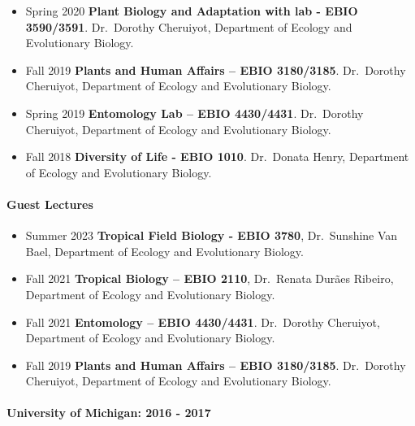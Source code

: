 \documentclass[11pt,a4paper,]{awesome-cv}
\begin{document}
\begin{itemize}
\item
  Spring 2020 \textbar{} \textbf{Plant Biology and Adaptation with lab -
  EBIO 3590/3591}. Dr.~Dorothy Cheruiyot, Department of Ecology and
  Evolutionary Biology.\\
\item
  Fall 2019 \textbar{} \textbf{Plants and Human Affairs -- EBIO
  3180/3185}. Dr.~Dorothy Cheruiyot, Department of Ecology and
  Evolutionary Biology.\\
\item
  Spring 2019 \textbar{} \textbf{Entomology Lab -- EBIO 4430/4431}.
  Dr.~Dorothy Cheruiyot, Department of Ecology and Evolutionary
  Biology.\\
\item
  Fall 2018 \textbar{} \textbf{Diversity of Life - EBIO 1010}.
  Dr.~Donata Henry, Department of Ecology and Evolutionary Biology.\\
\end{itemize}

\hypertarget{guest-lectures}{%
\paragraph{Guest Lectures}\label{guest-lectures}}

\begin{itemize}
\item
  Summer 2023 \textbar{} \textbf{Tropical Field Biology - EBIO 3780},
  Dr.~Sunshine Van Bael, Department of Ecology and Evolutionary Biology.
\item
  Fall 2021 \textbar{} \textbf{Tropical Biology -- EBIO 2110},
  Dr.~Renata Durães Ribeiro, Department of Ecology and Evolutionary
  Biology.\\
\item
  Fall 2021 \textbar{} \textbf{Entomology -- EBIO 4430/4431}.
  Dr.~Dorothy Cheruiyot, Department of Ecology and Evolutionary
  Biology.\\
\item
  Fall 2019 \textbar{} \textbf{Plants and Human Affairs -- EBIO
  3180/3185}. Dr.~Dorothy Cheruiyot, Department of Ecology and
  Evolutionary Biology.\\
\end{itemize}

\hypertarget{university-of-michigan-2016---2017}{%
\paragraph{University of Michigan: 2016 -
2017}\label{university-of-michigan-2016---2017}}
\end{document}

